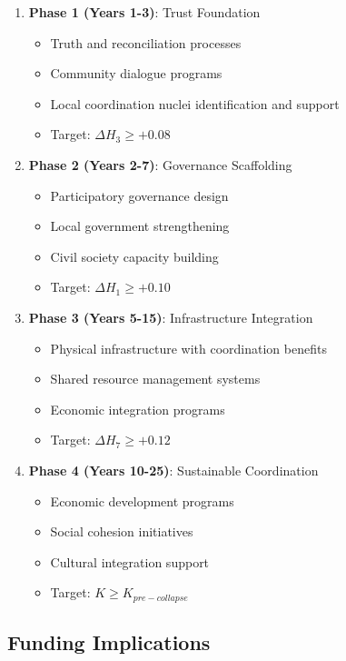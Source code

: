 \documentclass[11pt,letterpaper]{article}
\newcommand{\kindex}{K}
\begin{document}
\begin{enumerate}
\item \textbf{Phase 1 (Years 1-3)}: Trust Foundation
\begin{itemize}
\item Truth and reconciliation processes
\item Community dialogue programs
\item Local coordination nuclei identification and support
\item Target: $\Delta H_3 \geq +0.08$
\end{itemize}

\item \textbf{Phase 2 (Years 2-7)}: Governance Scaffolding
\begin{itemize}
\item Participatory governance design
\item Local government strengthening
\item Civil society capacity building
\item Target: $\Delta H_1 \geq +0.10$
\end{itemize}

\item \textbf{Phase 3 (Years 5-15)}: Infrastructure Integration
\begin{itemize}
\item Physical infrastructure with coordination benefits
\item Shared resource management systems
\item Economic integration programs
\item Target: $\Delta H_7 \geq +0.12$
\end{itemize}

\item \textbf{Phase 4 (Years 10-25)}: Sustainable Coordination
\begin{itemize}
\item Economic development programs
\item Social cohesion initiatives
\item Cultural integration support
\item Target: $\kindex \geq \kindex_{pre-collapse}$
\end{itemize}
\end{enumerate}

\subsection{Funding Implications}
\end{document}
